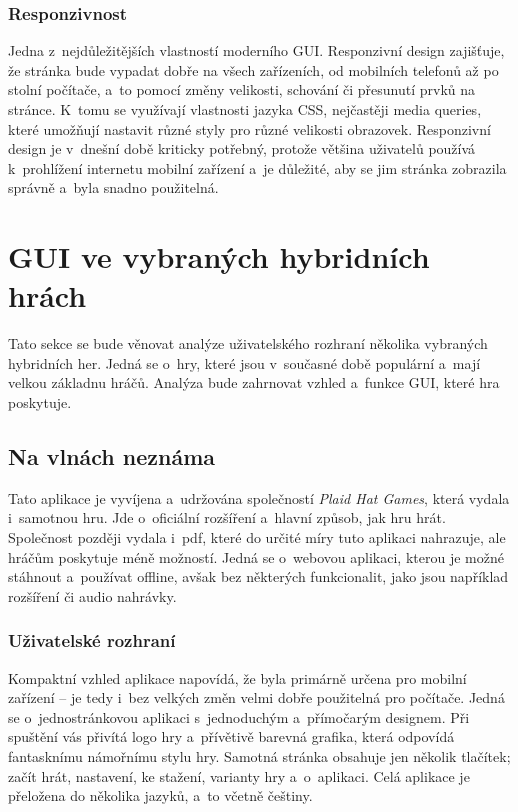 \subsubsection*{Responzivnost}
Jedna z~nejdůležitějších vlastností moderního GUI. Responzivní design zajišťuje, že stránka bude vypadat dobře na všech zařízeních, od mobilních telefonů až po stolní počítače, a~to pomocí změny velikosti, schování či přesunutí prvků na stránce. K~tomu se využívají vlastnosti jazyka CSS, nejčastěji media queries, které umožňují nastavit různé styly pro různé velikosti obrazovek. Responzivní design je v~dnešní době kriticky potřebný, protože většina uživatelů používá k~prohlížení internetu mobilní zařízení a~je důležité, aby se jim stránka zobrazila správně a~byla snadno použitelná. \cite{responsive_design}

\section{GUI ve vybraných hybridních hrách}
Tato sekce se bude věnovat analýze uživatelského rozhraní několika vybraných hybridních her. Jedná se o~hry, které jsou v~současné době populární a~mají velkou základnu hráčů. Analýza bude zahrnovat vzhled a~funkce GUI, které hra poskytuje.

\subsection{Na vlnách neznáma}
Tato aplikace je vyvíjena a~udržována společností \textit{Plaid Hat Games}, která vydala i~samotnou hru. Jde o~oficiální rozšíření a~hlavní způsob, jak hru hrát. Společnost později vydala i~pdf, které do určité míry tuto aplikaci nahrazuje, ale hráčům poskytuje méně možností. Jedná se o~webovou aplikaci, kterou je možné stáhnout a~používat offline, avšak bez některých funkcionalit, jako jsou například rozšíření či audio nahrávky.

\subsubsection*{Uživatelské rozhraní}
Kompaktní vzhled aplikace napovídá, že byla primárně určena pro mobilní zařízení -- je tedy i~bez velkých změn velmi dobře použitelná pro počítače. Jedná se o~jednostránkovou aplikaci s~jednoduchým a~přímočarým designem. Při spuštění vás přivítá logo hry a~přívětivě barevná grafika, která odpovídá fantasknímu námořnímu stylu hry. Samotná stránka obsahuje jen několik tlačítek; začít hrát, nastavení, ke stažení, varianty hry a~o~aplikaci. Celá aplikace je přeložena do několika jazyků, a~to včetně češtiny.

